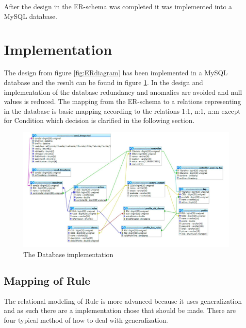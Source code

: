 After the design in the ER-schema was completed it was implemented into a MySQL database.  

\section{Implementation}

The design from figure \ref{fig:ERdiagram} has been implemented in a MySQL database and the result can be found in figure \ref{fig:databaseDiagram}. In the design and implementation of the database redundancy and anomalies are avoided and null values is reduced. 
The mapping from the ER-schema to a relations representing in the database is basic mapping according to the relations 1:1, n:1, n:m except for Condition which decision is clarified in the following section. 

\begin{figure}
	\centering
		\includegraphics[width=1.00\textwidth]{images/databaseDiagram.jpg}
	\caption{The Database implementation}
	\label{fig:databaseDiagram}
\end{figure}

\subsection{Mapping of Rule}
The relational modeling of Rule is more advanced because it uses generalization and as such there are a implementation chose that should be made. There are four typical method of how to deal with generalization.

